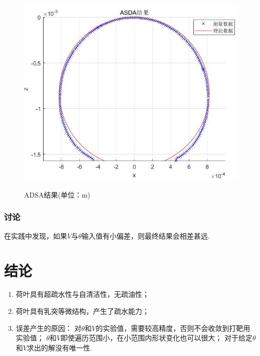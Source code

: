 \documentclass[a4paper,12pt]{article}%
\begin{document}
\begin{figure}[H]
{        \includegraphics[scale=0.2]{图像/glaco水结果.jpeg}
        }
    \caption{ADSA结果(单位：m)}\label{最终结果}
\end{figure}

\subsubsection{讨论}
在实践中发现，如果$V$与$\theta$输入值有小偏差，则最终结果会相差甚远. 

\section{结论}
\begin{spacing}{1.528}%
\begin{enumerate}
    \item 荷叶具有超疏水性与自清洁性，无疏油性；
    \item 荷叶具有乳突等微结构，产生了疏水能力；
    \item 误差产生的原因：
    对$\theta$和$V$的实验值，需要较高精度，否则不会收敛到打靶用实验值；
    $\theta$和$V$即使遍历范围小，在小范围内形状变化也可以很大；
    对于给定$\theta$和$V$求出的解没有唯一性. 
\end{enumerate}
\end{spacing}
\end{document}
